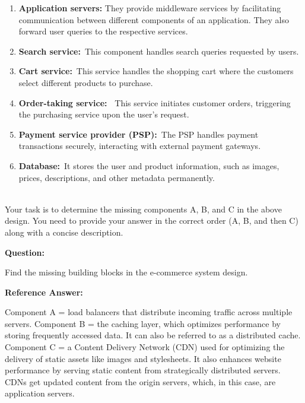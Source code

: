 \begin{enumerate}
\item
\protect{}\label{FEWdnetaRrmtZxjmXPMdf}
\textbf{Application servers:} They provide middleware services by facilitating communication between different components of an application. They also forward user queries to the respective services.
\item
\protect{}\label{h0HVi01RyOU7FxXxZXMXF}
\textbf{Search service:}~This component handles search queries requested by users.
\item
\protect{}\label{cWFO9QcYRmASYSWXbhB09}
\textbf{Cart service:}~This service handles the shopping cart where the customers select different products to purchase.
\item
\protect{}\label{NUjCB5g8IrksGIK_lqgQu}
\textbf{Order-taking service:~} This service initiates customer orders, triggering the purchasing service upon the user's request.
\item
\protect{}\label{Q53yg4lkf7k8NWdKbRtx8}
\textbf{Payment service provider (PSP):}~The PSP handles payment transactions securely, interacting with external payment gateways.
\item
\protect{}\label{KuXozvAQflYJzS2xI2FuY}
\textbf{Database:}~It stores the user and product information, such as images, prices, descriptions, and other metadata permanently.
\end{enumerate}
\\
Your task is to determine the missing components A, B, and C in the above design. You need to provide your answer in the correct order (A, B, and then C) along with a concise description.

\textbf{Question:}

Find the missing building blocks in the e-commerce system design.

\textbf{Reference Answer:}

Component A = load balancers that distribute incoming traffic across multiple servers. Component B = the caching layer, which optimizes performance by storing frequently accessed data. It can also be referred to as a distributed cache. Component
C = a Content Delivery Network (CDN) used for optimizing the delivery of static assets like images and stylesheets. It also enhances website performance by serving static content from strategically distributed servers. CDNs get updated content from the origin servers, which, in this case, are application servers.



